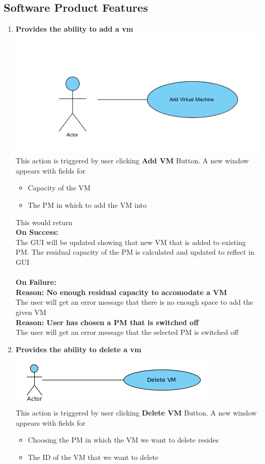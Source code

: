 \documentclass[a4paper,11pt]{article}
\begin{document}
		\subsection{Software Product Features}
			\begin{enumerate}
				\item {\bf Provides the ability to add a vm} \\
				\includegraphics{images/usecase}
				\\This action is triggered by user clicking {\bf Add VM } Button. A new window appears with fields for  
				\begin{itemize}
				 \item Capacity of the VM
				 \item The PM in which to add the VM into
				\end{itemize}
				
				This would return \\
				{\bf On Success: }\\
				The GUI will be updated showing that new  VM that is added to existing PM.
				The residual capacity of the PM is calculated and updated to reflect in GUI\\\\
				{\bf On Failure: } \\
				{\bf Reason: No enough residual capacity to accomodate a VM}\\
				The user will get an error message that there is no enough space to add the given VM\\
				{\bf Reason: User has chosen a PM that is switched off}\\
				The user will get an error message that the selected PM is switched off
				\item {\bf Provides the ability to delete a vm}\\
				\includegraphics{images/delete}
				\\This action is triggered by user clicking {\bf Delete VM } Button. A new window appears with fields for  
				\begin{itemize}
				 \item Choosing the PM in which the VM we want to delete resides
				 \item The ID of the VM that we want to delete
				\end{itemize}
				

\end{enumerate}
\end{document}
